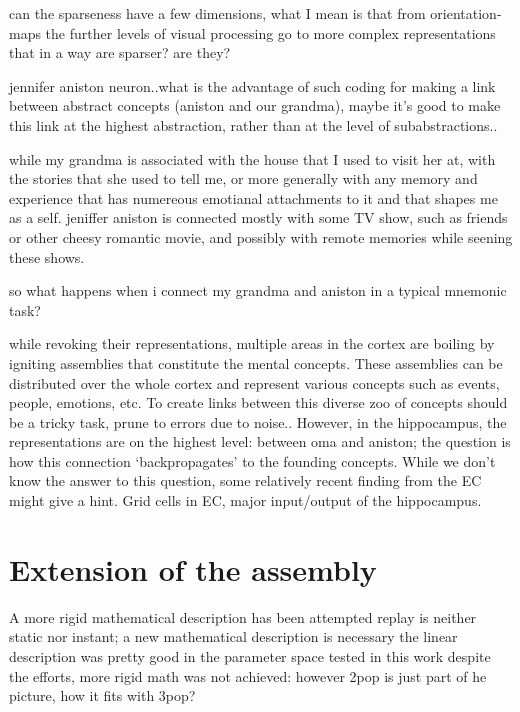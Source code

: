   can the sparseness have a few dimensions, what I mean is that from orientation-maps the further levels of visual processing go to more complex representations that in a way are sparser? are they?

  jennifer aniston neuron..what is the advantage of such coding
  for making a link between abstract concepts (aniston and our grandma), maybe it's good to make this link 
  at the highest abstraction, rather than at the level of subabstractions..

  while my grandma is associated with the house that I used to visit her at,
  with the stories that she used to tell me, or more generally with any memory and experience
  that has numereous emotianal attachments to it and that shapes me as a self.
  jeniffer aniston is connected mostly with some TV show, such as friends or
  other cheesy romantic movie, and possibly with remote memories while seening
  these shows.

  so what happens when i connect my grandma and aniston in a typical mnemonic
  task?

  while revoking their representations, multiple areas in the cortex are boiling
  by igniting assemblies that constitute the mental concepts. These assemblies
  can be distributed over the whole cortex and represent various concepts such
  as events, people, emotions, etc. To create links between this diverse zoo of
  concepts should be a tricky task, prune to errors due to noise.. However, in
  the hippocampus, the representations are on the highest level: between oma
  and aniston; the question is how this connection `backpropagates' to the
  founding concepts. While we don't know the answer to this question, some relatively
  recent finding from the EC might give a hint. Grid cells in EC, major input/output of the hippocampus.


\section{Extension of the assembly}
  A more rigid mathematical description has been attempted 
  replay is neither static nor instant; a new mathematical description is necessary
  the linear description was pretty good in the
  parameter space tested in this work
  despite the efforts, more rigid math was not achieved:
  however 2pop is just part of he picture, how it fits with 3pop?



